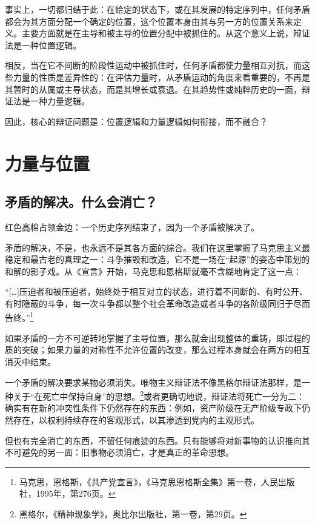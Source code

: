\documentclass[fontset=fandol, a4paper, 12pt, twoside]{ctexart}
\renewenvironment{quote}
  {\list{}{\rightmargin=0cm \leftmargin=2em}%
   \item\relax\small\kaishu\color{black}}
  {\endlist}
\begin{document}
事实上，一切都归结于此：在给定的状态下，或在其发展的特定序列中，任何矛盾都会为其方面分配一个确定的位置，这个位置本身由其与另一方的位置关系来定义。主要方面就是在主导和被主导的位置分配中被抓住的。从这个意义上说，辩证法是一种位置逻辑。

相反，当在它不间断的阶段性运动中被抓住时，任何矛盾都使力量相互对抗，而这些力量的性质是差异性的：在评估力量时，从矛盾运动的角度来看重要的，不再是其暂时的从属或主导状态，而是其增长或衰退。在其趋势性或纯粹历史的一面，辩证法是一种力量逻辑。

因此，核心的辩证问题是：位置逻辑和力量逻辑如何衔接，而不融合？

\section{力量与位置}

\subsection{矛盾的解决。什么会消亡？}

红色高棉占领金边：一个历史序列结束了，因为一个矛盾被解决了。

矛盾的解决，不是，也永远不是其各方面的综合。我们在这里掌握了马克思主义最稳定和最古老的真理之一：斗争摧毁和改造，它不是一场在“起源”的姿态中策划的和解的影子戏。从《宣言》开始，马克思和恩格斯就毫不含糊地肯定了这一点：

\begin{quote}
“[…]压迫者和被压迫者，始终处于相互对立的状态，进行着不间断的、有时公开、有时隐蔽的斗争，每一次斗争都以整个社会革命改造或者斗争的各阶级同归于尽而告终。”\footnote{马克思，恩格斯，《共产党宣言》，《马克思恩格斯全集》第一卷，人民出版社，1995年，第276页。}
\end{quote}

如果矛盾的一方不可逆转地掌握了主导位置，那么就会出现整体的重铸，即过程的质的突破；如果力量的对称性不允许位置的改变，那么过程本身就会在两方的相互消灭中结束。

一个矛盾的解决要求某物必须消失。唯物主义辩证法不像黑格尔辩证法那样，是一种关于“在死亡中保持自身”的思想。\footnote{黑格尔，《精神现象学》，奥比尔出版社，第一卷，第29页。}或者更确切地说，辩证法将死亡一分为二：确实有在新的冲突性条件下仍然存在的东西：例如，资产阶级在无产阶级专政下仍然存在，以权利持续存在的客观形式，以其渗透到党内的主观形式。

但也有完全消亡的东西，不留任何痕迹的东西。只有能够将对新事物的认识推向其不可避免的另一面：旧事物必须消亡，才是真正的革命思想。
\end{document}
